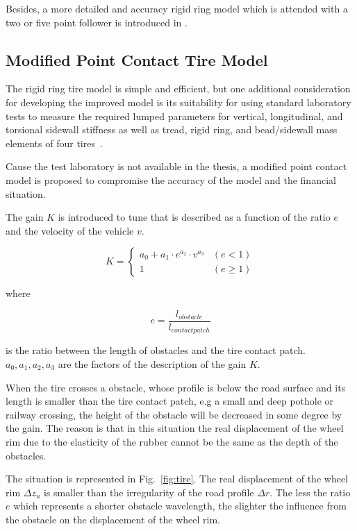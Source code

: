 Besides, a more detailed and accuracy rigid ring model which is attended with a two or five point follower is introduced in \cite{na2016rigid}.
 
 
\subsection{Modified Point Contact Tire Model}
\label{sec:improved_pcm}
 
The rigid ring tire model is simple and efficient, but one additional consideration for developing the improved model is its suitability for using standard laboratory tests to measure the required lumped parameters for vertical, longitudinal, and torsional sidewall stiffness as well as tread, rigid ring, and bead/sidewall mass elements of four tires~\cite{na2016rigid}.

Cause the test laboratory is not available in the thesis, a modified point contact model is proposed to compromise the accuracy of the model and the financial situation.

The gain {$K$} is introduced to tune that is described as a function of the ratio {$e$} and the velocity of the vehicle {$v$}.


 \begin{equation}
 K=\begin{cases}
    a_0+a_1\cdot e^{a_2}\cdot v^{a_3} & (e < 1) \\
    1 & (e \geq 1)
 \end{cases}
 \end{equation}
 \label{form:K}
 
where

\begin{equation}
    e = \frac{l_{obstacle}}{l_{contact patch}}
\end{equation}

is the ratio between the length of obstacles and the tire contact patch.
%
$a_0, a_1, a_2, a_3$ are the factors of the description of the gain $K$.

When the tire crosses a obstacle, whose profile is below the road surface and its length is smaller than the tire contact patch, e.g a small and deep pothole or railway crossing, the height of the obstacle will be decreased in some degree by the gain.
%
The reason is that in this situation the real displacement of the wheel rim due to the elasticity of the rubber cannot be the same as the depth of the obstacles.

The situation is represented in Fig.~\ref{fig:tire}.
%
The real displacement of the wheel rim $\Delta z_u$ is smaller than the irregularity of the road profile $\Delta r$.
%
The less the ratio $e$ which represents a shorter obstacle wavelength, the slighter the influence from the obstacle on the displacement of the wheel rim.

